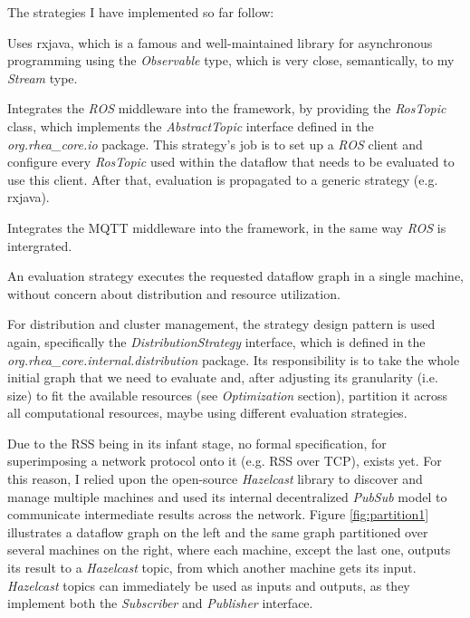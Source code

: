 \documentclass{dithesis}
\begin{document}
The strategies I have implemented so far follow:

\begin{description}[style=nextline]
\item[RxJavaEvaluationStrategy\site{https://github.com/rhea-flow/rx-eval}] 
Uses rxjava, which is a famous and well-maintained library for asynchronous programming using the \textit{Observable} type, which is very close, semantically, to my \textit{Stream} type.

\item[RosEvaluationStrategy\site{https://github.com/rhea-flow/ros-eval}] 
Integrates the \textit{ROS} middleware into the framework, by providing the \textit{RosTopic} class, which implements the \textit{AbstractTopic} interface defined in the \textit{org.rhea\_core.io} package. This strategy's job is to set up a \textit{ROS} client and configure every \textit{RosTopic} used within the dataflow that needs to be evaluated to use this client. After that, evaluation is propagated to a generic strategy (e.g. rxjava).

\item[MqttEvaluationStrategy\site{https://github.com/rhea-flow/mqtt-eval}] 
Integrates the MQTT middleware into the framework, in the same way \textit{ROS} is intergrated.
\end{description}


An evaluation strategy executes the requested dataflow graph in a single machine, without concern about distribution and resource utilization.

For distribution and cluster management, the strategy design pattern is used again, specifically the \textit{DistributionStrategy} interface, which is defined in the \textit{org.rhea\_core.internal.distribution} package. Its responsibility is to take the whole initial graph that we need to evaluate and, after adjusting its granularity (i.e. size) to fit the available resources (see \textit{Optimization} section), partition it across all computational resources, maybe using different evaluation strategies.


Due to the RSS being in its infant stage, no formal specification, for superimposing a network protocol onto it (e.g. RSS over TCP), exists yet. For this reason, I relied upon the open-source \textit{Hazelcast} library\cite{hazelcast} to discover and manage multiple machines and used its internal decentralized \textit{PubSub} model to communicate intermediate results across the network. Figure \ref{fig:partition1} illustrates a dataflow graph on the left and the same graph partitioned over several machines on the right, where each machine, except the last one, outputs its result to a \textit{Hazelcast} topic, from which another machine gets its input. \textit{Hazelcast} topics can immediately be used as inputs and outputs, as they implement both the \textit{Subscriber} and \textit{Publisher} interface.
\end{document}
